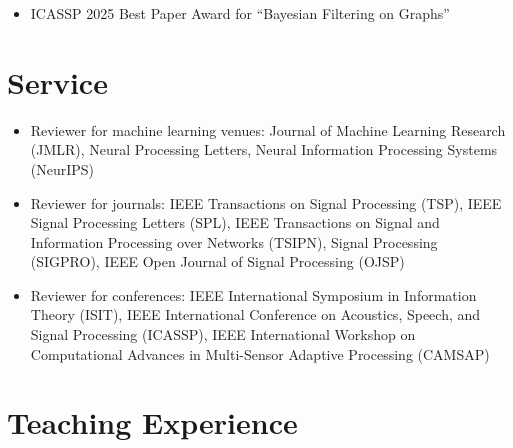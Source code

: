 \documentclass[letterpaper,10pt]{article}
\newcommand{\resumeBullet}[1]{\item[\textbullet]\small{#1}}
\newcommand{\resumeSubHeadingList}{\begin{itemize}[leftmargin=0.05in, label={}]}
\newcommand{\resumeSubHeadingListEnd}{\end{itemize}}
\begin{document}
\begin{itemize}[leftmargin=0.25in, label={}]
\begin{itemize}[leftmargin=0.25in, label={}]
\begin{itemize}[leftmargin=0.35in, label={}]
\begin{itemize}[leftmargin=0.28in, label={}]
\resumeSubHeadingList
    \resumeBullet{
      ICASSP 2025 Best Paper Award for 
      ``Bayesian Filtering on Graphs''
    }
\resumeSubHeadingListEnd

\section{Service}

\resumeSubHeadingList
    \resumeBullet{
        Reviewer for machine learning venues:
        Journal of Machine Learning Research (JMLR),
        Neural Processing Letters, 
        Neural Information Processing Systems (NeurIPS)
    }
    \resumeBullet{
        Reviewer for journals: 
        IEEE Transactions on Signal Processing (TSP),
        IEEE Signal Processing Letters (SPL), 
        IEEE Transactions on Signal and Information Processing over Networks (TSIPN),
        Signal Processing (SIGPRO),
        IEEE Open Journal of Signal Processing (OJSP)
    }
    \resumeBullet{
        Reviewer for conferences:
        IEEE International Symposium in Information Theory (ISIT),
        IEEE International Conference on Acoustics, Speech, and Signal Processing (ICASSP),
        IEEE International Workshop on Computational Advances in Multi-Sensor Adaptive Processing (CAMSAP)
    }
\resumeSubHeadingListEnd



\section{Teaching Experience}


\end{itemize}
\end{itemize}
\end{itemize}
\end{itemize}
\end{document}

